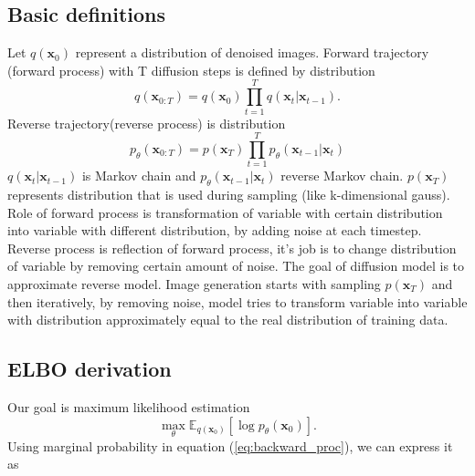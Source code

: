 \documentclass[10pt]{article}
\begin{document}
 \subsection{Basic definitions}
 Let $  q( \textbf{x}_{0}  ) $ represent a distribution of denoised images. Forward trajectory (forward process) with T diffusion steps is defined by distribution
 \begin{equation}
     q( \textbf{x}_{0 : T} ) = q( \textbf{x}_{0}  ) \prod_{t=1}^{T} q( \textbf{x}_{t}|  \textbf{x}_{t -1 }  ).
 \end{equation}
Reverse trajectory(reverse process) is distribution  
 \begin{equation} \label{eq:backward_proc}
     p_{\theta}( \textbf{x}_{0:T} ) = p( \textbf{x}_{T}  ) \prod_{t=1}^{T} p_{\theta}( \textbf{x}_{t-1}|  \textbf{x}_{t }  )
 \end{equation}
$q( \textbf{x}_{t}|  \textbf{x}_{t -1 }  )$ is Markov chain and $p_{\theta}( \textbf{x}_{t-1}|  \textbf{x}_{t }  )$ reverse Markov chain.
$p( \textbf{x}_{T}  )$ represents distribution that is used during sampling (like k-dimensional gauss). Role of forward process is transformation of variable with certain distribution into variable with different distribution, by adding noise at each timestep. Reverse process is reflection of forward process, it's job is to change distribution of variable by removing certain amount of noise. The goal of diffusion model is to approximate reverse model. Image generation starts with sampling $p( \textbf{x}_{T}  )$ and then iteratively, by removing noise, model tries to transform variable into variable with distribution approximately equal to the real distribution of training data.
\subsection{ELBO derivation}
Our goal is maximum likelihood estimation
 \begin{equation}
    \max_{\theta}\mathbb{E}_{q(\textbf{x}_{0})} [\log  p_{\theta}( \textbf{x}_{0}) ].
 \end{equation}
Using marginal probability in equation (\ref{eq:backward_proc}), we can express it as 
 
\end{document}
